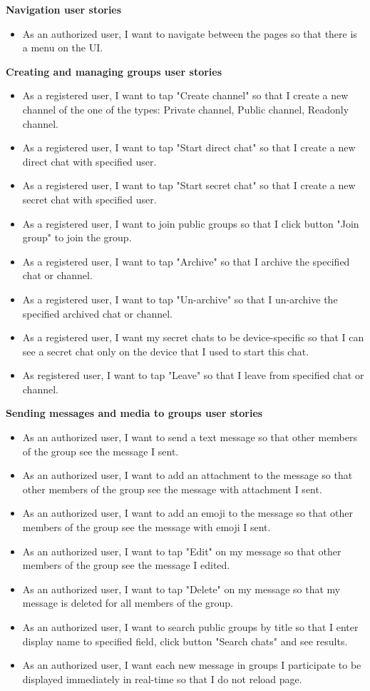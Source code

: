 \textbf{Navigation user stories}
\begin{itemize}
    \item As an authorized user, I want to navigate between the pages so that there is a menu on the UI.
\end{itemize}

\textbf{Creating and managing groups user stories}
\begin{itemize}
    \item As a registered user, I want to tap "Create channel" so that I create a new channel of the one of the types:
    Private channel, Public channel, Readonly channel.
    \item As a registered user, I want to tap "Start direct chat" so that I create a new direct chat with specified user.
    \item As a registered user, I want to tap "Start secret chat" so that I create a new secret chat with specified user.
    \item As a registered user, I want to join public groups so that I click button "Join group" to join the group.
    \item As a registered user, I want to tap "Archive" so that I archive the specified chat or channel.
    \item As a registered user, I want to tap "Un-archive" so that I un-archive the specified archived chat or channel.
    \item As a registered user, I want my secret chats to be device-specific so that I can see a secret chat only
    on the device that I used to start this chat.
    \item As registered user, I want to tap "Leave" so that I leave from specified chat or channel.
\end{itemize}

\textbf{Sending messages and media to groups user stories}
\begin{itemize}
    \item As an authorized user, I want to send a text message so that other members of the group see the message I sent.
    \item As an authorized user, I want to add an attachment to the message so that other members of the group see the
    message with attachment I sent.
    \item As an authorized user, I want to add an emoji to the message so that other members of the group see the message with emoji I sent.
    \item As an authorized user, I want to tap "Edit" on my message so that other members of the group see the message I edited.
    \item As an authorized user, I want to tap "Delete" on my message so that my message is deleted for all members of the group.
    \item As an authorized user, I want to search public groups by title so that I enter display name to specified field,
    click button "Search chats" and see results.
    \item As an authorized user, I want each new message in groups I participate to be displayed immediately in
    real-time so that I do not reload page.
\end{itemize}

